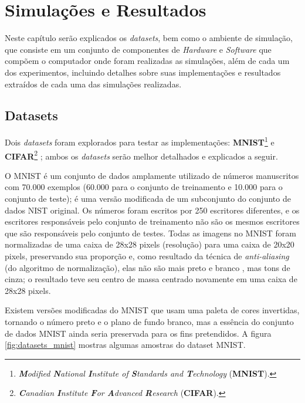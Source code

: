 \chapter{Simulações e Resultados}
\label{cha:results}

Neste capítulo serão explicados os \textit{datasets}, bem como o ambiente de simulação, que consiste em um conjunto de componentes de \textit{Hardware} e \textit{Software} que compõem o computador onde foram realizadas as simulações, além de cada um dos experimentos, incluindo detalhes sobre suas implementações e resultados extraídos de cada uma das simulações realizadas.



\section{Datasets}
\label{sec:results_datasets}

Dois \textit{datasets} foram explorados para testar as implementações: \textbf{MNIST}\footnote{\textit{\textbf{M}odified \textbf{N}ational \textbf{I}nstitute of \textbf{S}tandards and \textbf{T}echnology} (\textbf{MNIST}).} \citep{lecun-mnisthandwrittendigit-2010} e \textbf{CIFAR}\footnote{\textit{\textbf{C}anadian \textbf{I}nstitute \textbf{F}or \textbf{A}dvanced \textbf{R}esearch} (\textbf{CIFAR}).} \citep{cifar-dataset}; ambos os \textit{datasets} serão melhor detalhados e explicados a seguir.

O MNIST é um conjunto de dados amplamente utilizado de números manuscritos com 70.000 exemplos (60.000 para o conjunto de treinamento e 10.000 para o conjunto de teste); é uma versão modificada de um subconjunto do conjunto de dados NIST original. Os números foram escritos por 250 escritores diferentes, e os escritores responsáveis pelo conjunto de treinamento não são os mesmos escritores que são responsáveis pelo conjunto de testes. Todas as imagens no MNIST foram normalizadas de uma caixa de 28x28 pixels (resolução) para uma caixa de 20x20 pixels, preservando sua proporção e, como resultado da técnica de \textit{anti-aliasing} (do algoritmo de normalização), elas não são mais preto e branco , mas tons de cinza; o resultado teve seu centro de massa centrado novamente em uma caixa de 28x28 pixels.

Existem versões modificadas do MNIST que usam uma paleta de cores invertidas, tornando o número preto e o plano de fundo branco, mas a essência do conjunto de dados MNIST ainda seria preservada para os fins pretendidos. A figura \ref{fig:datasets_mnist} mostras algumas amostras do dataset MNIST.


